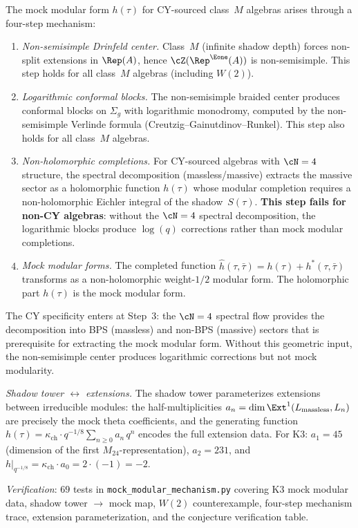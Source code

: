\begin{remark}
\label{rem:four-step-mock-mechanism}
The mock modular form $h(\tau)$ for CY-sourced class~$M$ algebras arises through a four-step mechanism:
\begin{enumerate}[label=\textup{Step~\arabic*:}, leftmargin=4em]
\item \emph{Non-semisimple Drinfeld center.} Class~$M$ (infinite shadow depth) forces non-split extensions in $\Rep(A)$, hence $\cZ(\Rep^{\Eone}(A))$ is non-semisimple. This step holds for all class~$M$ algebras (including $W(2)$).
\item \emph{Logarithmic conformal blocks.} The non-semisimple braided center produces conformal blocks on $\Sigma_g$ with logarithmic monodromy, computed by the non-semisimple Verlinde formula (Creutzig--Gainutdinov--Runkel). This step also holds for all class~$M$ algebras.
\item \emph{Non-holomorphic completions.} For CY-sourced algebras with $\cN = 4$ structure, the spectral decomposition (massless/massive) extracts the massive sector as a holomorphic function $h(\tau)$ whose modular completion requires a non-holomorphic Eichler integral of the shadow~$S(\tau)$. \textbf{This step fails for non-CY algebras}: without the $\cN = 4$ spectral decomposition, the logarithmic blocks produce $\log(q)$ corrections rather than mock modular completions.
\item \emph{Mock modular forms.} The completed function $\hat{h}(\tau, \bar\tau) = h(\tau) + h^*(\tau, \bar\tau)$ transforms as a non-holomorphic weight-$1/2$ modular form. The holomorphic part $h(\tau)$ is the mock modular form.
\end{enumerate}
The CY specificity enters at Step~3: the $\cN = 4$ spectral flow provides the decomposition into BPS (massless) and non-BPS (massive) sectors that is prerequisite for extracting the mock modular form. Without this geometric input, the non-semisimple center produces logarithmic corrections but not mock modularity.

\smallskip\noindent
\textit{Shadow tower $\leftrightarrow$ extensions.} The shadow tower parameterizes extensions between irreducible modules: the half-multiplicities $a_n = \dim \Ext^1(L_{\mathrm{massless}}, L_n)$ are precisely the mock theta coefficients, and the generating function $h(\tau) = \kappa_{\mathrm{ch}} \cdot q^{-1/8} \sum_{n \geq 0} a_n\,q^n$ encodes the full extension data. For K3: $a_1 = 45$ (dimension of the first $M_{24}$-representation), $a_2 = 231$, and $h|_{q^{-1/8}} = \kappa_{\mathrm{ch}} \cdot a_0 = 2 \cdot (-1) = -2$.

\smallskip\noindent
\textit{Verification}: $69$ tests in \texttt{mock\_modular\_mechanism.py} covering K3 mock modular data, shadow tower $\to$ mock map, $W(2)$ counterexample, four-step mechanism trace, extension parameterization, and the conjecture verification table.
\end{remark}


